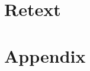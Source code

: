 \cleardoublepage

\pagestyle{scrheadings}
\cleardoublepage
\cleardoublepage
\cleardoublepage
\part{Retext}
\glsresetall %

\cleardoublepage
% 
% 
\appendix
\cleardoublepage
\part{Appendix}
% 
\cleardoublepage

\cleardoublepage

